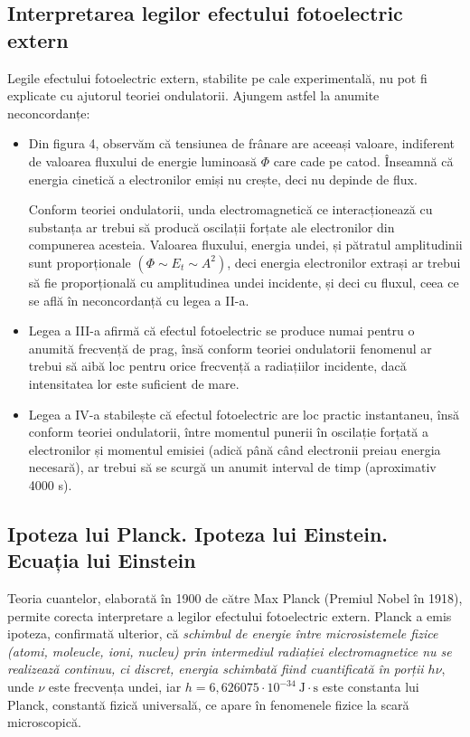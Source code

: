\subsection{Interpretarea legilor efectului fotoelectric extern}

Legile efectului fotoelectric extern, stabilite pe cale experimentală, nu pot fi
explicate cu ajutorul teoriei ondulatorii. Ajungem astfel la anumite neconcordanțe:

\begin{itemize}
    \item Din figura 4, observăm că tensiunea de frânare are aceeași valoare,
        indiferent de valoarea fluxului de energie luminoasă $\Phi$ care cade
        pe catod. Înseamnă că energia cinetică a electronilor emiși nu crește,
        deci nu depinde de flux.

        Conform teoriei ondulatorii, unda electromagnetică ce interacționează
        cu substanța ar trebui să producă oscilații forțate ale electronilor
        din compunerea acesteia. Valoarea fluxului, energia undei, și pătratul
        amplitudinii sunt proporționale \( (\Phi \sim E_t \sim A^2) \),
        deci energia electronilor extrași ar trebui să fie proporțională cu
        amplitudinea undei incidente, și deci cu fluxul, ceea ce se află în
        neconcordanță cu legea a II-a.

    \item Legea a III-a afirmă că efectul fotoelectric se produce numai pentru
        o anumită frecvență de prag, însă conform teoriei ondulatorii fenomenul
        ar trebui să aibă loc pentru orice frecvență a radiațiilor incidente,
        dacă intensitatea lor este suficient de mare.

    \item Legea a IV-a stabilește că efectul fotoelectric are loc practic
        instantaneu, însă conform teoriei ondulatorii, între momentul punerii
        în oscilație forțată a electronilor și momentul emisiei (adică până
        când electronii preiau energia necesară), ar trebui să se scurgă un
        anumit interval de timp (aproximativ 4000 s).
\end{itemize}

\subsection{Ipoteza lui Planck. Ipoteza lui Einstein. Ecuația lui Einstein}

Teoria cuantelor, elaborată în 1900 de către Max Planck (Premiul Nobel în
1918), permite corecta interpretare a legilor efectului fotoelectric extern.
Planck a emis ipoteza, confirmată ulterior, că \emph{schimbul de energie între
microsistemele fizice (atomi, moleucle, ioni, nucleu) prin intermediul
radiației electromagnetice nu se realizează continuu, ci discret, energia
schimbată fiind cuantificată în porții $h\nu$}, unde $\nu$ este frecvența
undei, iar \( h = 6,626075 \cdot 10^{-34} ~ \mathrm{J \cdot s} \) este
constanta lui Planck, constantă fizică universală, ce apare în fenomenele
fizice la scară microscopică.

